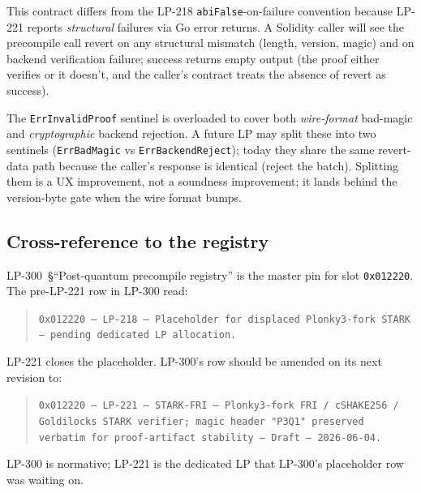 This contract differs from the LP-218 \texttt{abiFalse}-on-failure
convention because LP-221 reports \emph{structural} failures via
Go error returns. A Solidity caller will see the precompile call
revert on any structural mismatch (length, version, magic) and on
backend verification failure; success returns empty output (the
proof either verifies or it doesn't, and the caller's contract
treats the absence of revert as success).

The \texttt{ErrInvalidProof} sentinel is overloaded to cover both
\emph{wire-format} bad-magic and \emph{cryptographic} backend
rejection. A future LP may split these into two sentinels
(\texttt{ErrBadMagic} vs \texttt{ErrBackendReject}); today they
share the same revert-data path because the caller's response is
identical (reject the batch). Splitting them is a UX improvement,
not a soundness improvement; it lands behind the version-byte gate
when the wire format bumps.

\subsection{Cross-reference to the registry}

LP-300~\S``Post-quantum precompile registry'' is the master pin for
slot \texttt{0x012220}. The pre-LP-221 row in LP-300 read:

\begin{quote}
\texttt{0x012220 -- LP-218 -- Placeholder for displaced
Plonky3-fork STARK -- pending dedicated LP allocation.}
\end{quote}

LP-221 closes the placeholder. LP-300's row should be amended on
its next revision to:

\begin{quote}
\texttt{0x012220 -- LP-221 -- STARK-FRI -- Plonky3-fork FRI~/
cSHAKE256~/ Goldilocks STARK verifier; magic header "P3Q1"
preserved verbatim for proof-artifact stability -- Draft --
2026-06-04.}
\end{quote}

LP-300 is normative; LP-221 is the dedicated LP that LP-300's
placeholder row was waiting on.
